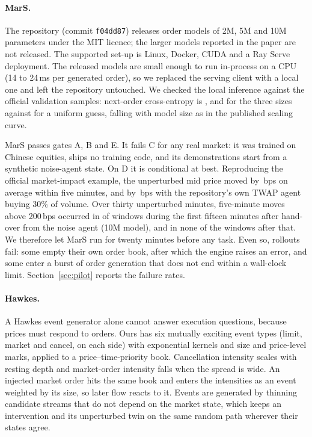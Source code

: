 \paragraph{MarS.} The repository (commit \texttt{f04dd87}) releases order models of 2M, 5M and 10M parameters under the MIT licence; the larger models reported in the paper are not released. The supported set-up is Linux, Docker, CUDA and a Ray Serve deployment. The released models are small enough to run in-process on a CPU (14 to 24\,ms per generated order), so we replaced the serving client with a local one and left the repository untouched. We checked the local inference against the official validation samples: next-order cross-entropy is \marsNllTwo{}, \marsNllFive{} and \marsNllTen{} for the three sizes against \marsNllUniform{} for a uniform guess, falling with model size as in the published scaling curve.

MarS passes gates A, B and E. It fails C for any real market: it was trained on Chinese equities, ships no training code, and its demonstrations start from a synthetic noise-agent state. On D it is conditional at best. Reproducing the official market-impact example, the unperturbed mid price moved by \marsOfficialBase{}\,bps on average within five minutes, and by \marsOfficialTwap{}\,bps with the repository's own TWAP agent buying 30\% of volume. Over thirty unperturbed minutes, five-minute moves above 200\,bps occurred in \marsEarlyShare{} of windows during the first fifteen minutes after hand-over from the noise agent (10M model), and in none of the windows after that. We therefore let MarS run for twenty minutes before any task. Even so, rollouts fail: some empty their own order book, after which the engine raises an error, and some enter a burst of order generation that does not end within a wall-clock limit. Section~\ref{sec:pilot} reports the failure rates.

\paragraph{Hawkes.} A Hawkes event generator alone cannot answer execution questions, because prices must respond to orders. Ours has six mutually exciting event types (limit, market and cancel, on each side) with exponential kernels and size and price-level marks, applied to a price--time-priority book. Cancellation intensity scales with resting depth and market-order intensity falls when the spread is wide. An injected market order hits the same book and enters the intensities as an event weighted by its size, so later flow reacts to it. Events are generated by thinning \citep{ogata1981lewis} candidate streams that do not depend on the market state, which keeps an intervention and its unperturbed twin on the same random path wherever their states agree.

